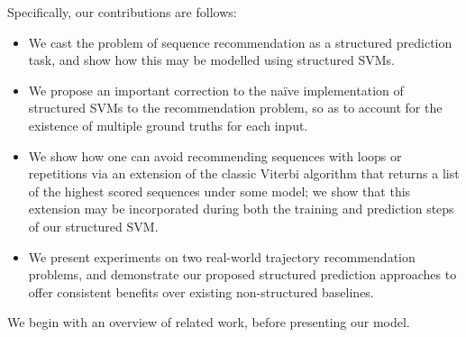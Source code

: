 Specifically, our contributions are follows:
\begin{itemize}[leftmargin=0.1in,itemsep=2pt]
	\item We cast the problem of sequence recommendation as a structured prediction task, and show how this may be modelled using structured SVMs.

	\item We propose an important correction to the na\"{i}ve implementation of structured SVMs to the recommendation problem, so as to account for the existence of multiple ground truths for each input.

	\item We show how one can avoid recommending sequences with loops or repetitions via an extension of the classic Viterbi algorithm that returns a list of the highest scored sequences under some model; we show that this extension may be incorporated during both the training and prediction steps of our structured SVM.

	\item We present experiments on two real-world trajectory recommendation problems, and demonstrate our proposed structured prediction approaches to offer consistent benefits over existing non-structured baselines.
\end{itemize}

We begin with an overview of related work, before presenting our model.




%

